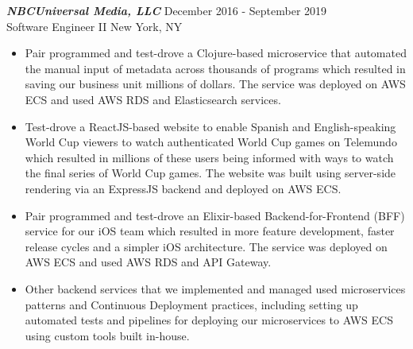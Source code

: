 {\sl \textbf{NBCUniversal Media, LLC}} \hfill December 2016 - September 2019 \\ Software Engineer II \hfill New York, NY
\begin{itemize}
    \item Pair programmed and test-drove a Clojure-based microservice that automated the manual input of metadata across thousands of programs which resulted in saving our business unit millions of dollars. The service was deployed on AWS ECS and used AWS RDS and Elasticsearch services.
    \item Test-drove a ReactJS-based website to enable Spanish and English-speaking World Cup viewers to watch authenticated World Cup games on Telemundo which resulted in millions of these users being informed with ways to watch the final series of World Cup games. The website was built using server-side rendering via an ExpressJS backend and deployed on AWS ECS.
    \item Pair programmed and test-drove an Elixir-based Backend-for-Frontend (BFF) service for our iOS team which resulted in more feature development, faster release cycles and a simpler iOS architecture. The service was deployed on AWS ECS and used AWS RDS and API Gateway.
    \item Other backend services that we implemented and managed used microservices patterns and Continuous Deployment practices, including setting up automated tests and pipelines for deploying our microservices to AWS ECS using custom tools built in-house.
\end{itemize}

